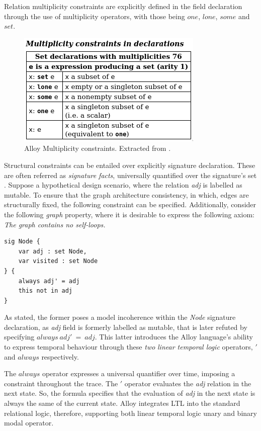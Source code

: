 Relation multiplicity constraints are explicitly defined in the field declaration through the use of multiplicity operators, with those being $one$, $lone$, $some$ and $set$.

\begin{figure}[H]
    \centering
    \includegraphics[width=0.4\linewidth]{images/alloy_multiplicity.png}
    \caption{Alloy Multiplicity constraints. Extracted from \cite{alloy-qr}.} 
    \label{fig:alloy-multiplicity}
\end{figure}


Structural constraints can be entailed over explicitly signature declaration. These are often referred as \textit{signature facts}, universally quantified over the signature's set \cite{alloy-qr}. Suppose a hypothetical design scenario, where the relation \textit{adj} is labelled as mutable. To ensure that the graph architecture consistency, in which, edges are structurally fixed, the following constraint can be specified. Additionally, consider the following \textit{graph} property, where it is desirable to express the following axiom: \textit{The graph contains no self-loops.}

\begin{lstlisting}[title={\textit{Node} hypothetical constraints over the signature definition.}, otherkeywords = {abstract, sig, module, var, set, fact, extends, no, in, this, not, always, \', \=}, floatplacement=H]
sig Node {
    var adj : set Node, 
    var visited : set Node
} {
    always adj' = adj
    this not in adj
}
\end{lstlisting}

As stated, the former poses a model incoherence within the \textit{Node} signature declaration, as \textit{adj} field is formerly labelled as mutable, that is later refuted by specifying $always \ adj'\ =\ adj$. This latter introduces the Alloy language's ability to express temporal behaviour through these \textit{two} \textit{linear temporal logic} operators, $'$ and $always$ respectively. 

The $always$ operator expresses a universal quantifier over time, imposing a constraint throughout the trace. The $'$ operator evaluates the \textit{adj} relation in the next state. So, the formula specifies that the evaluation of \textit{adj} in the next state is always the same of the current state. Alloy integrates LTL into the standard relational logic, therefore, supporting both linear temporal logic unary and binary modal operator.

